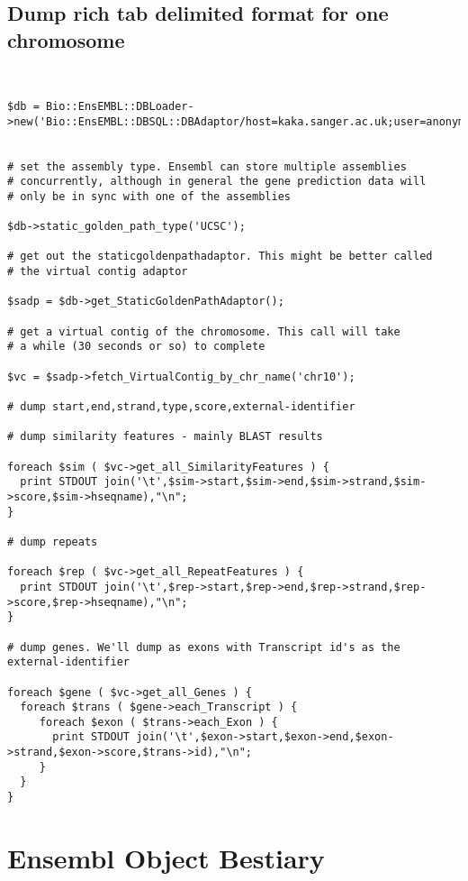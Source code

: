\documentclass[11pt,a4paper]{article}
\begin{document}
\subsection{Dump rich tab delimited format for one chromosome}

\begin{verbatim}


$db = Bio::EnsEMBL::DBLoader->new('Bio::EnsEMBL::DBSQL::DBAdaptor/host=kaka.sanger.ac.uk;user=anonymous;dbname=current');


# set the assembly type. Ensembl can store multiple assemblies
# concurrently, although in general the gene prediction data will
# only be in sync with one of the assemblies

$db->static_golden_path_type('UCSC');

# get out the staticgoldenpathadaptor. This might be better called
# the virtual contig adaptor

$sadp = $db->get_StaticGoldenPathAdaptor();

# get a virtual contig of the chromosome. This call will take
# a while (30 seconds or so) to complete

$vc = $sadp->fetch_VirtualContig_by_chr_name('chr10');

# dump start,end,strand,type,score,external-identifier

# dump similarity features - mainly BLAST results

foreach $sim ( $vc->get_all_SimilarityFeatures ) {
  print STDOUT join('\t',$sim->start,$sim->end,$sim->strand,$sim->score,$sim->hseqname),"\n";
}

# dump repeats

foreach $rep ( $vc->get_all_RepeatFeatures ) {
  print STDOUT join('\t',$rep->start,$rep->end,$rep->strand,$rep->score,$rep->hseqname),"\n";
}

# dump genes. We'll dump as exons with Transcript id's as the external-identifier

foreach $gene ( $vc->get_all_Genes ) {
  foreach $trans ( $gene->each_Transcript ) {
     foreach $exon ( $trans->each_Exon ) {
       print STDOUT join('\t',$exon->start,$exon->end,$exon->strand,$exon->score,$trans->id),"\n";
     }
  }
}

\end{verbatim}

\section{Ensembl Object Bestiary}
\end{document}
